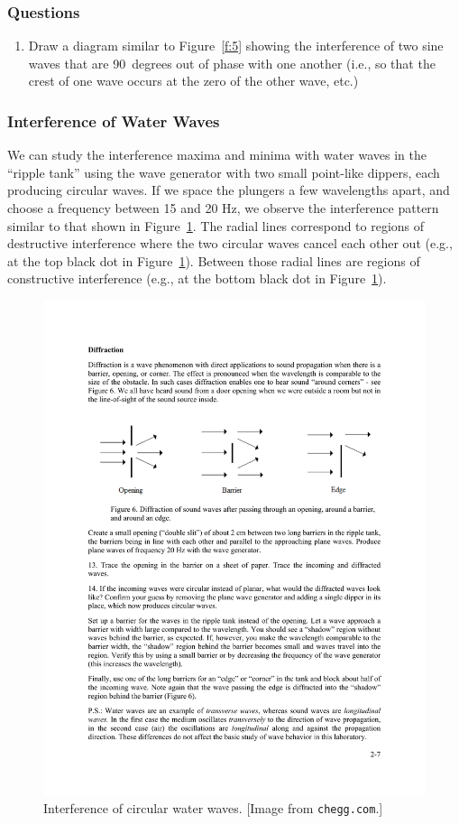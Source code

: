 \documentclass[11pt]{NSF}
\def\ben{\begin{enumerate}}
\def\een{\end{enumerate}}
\def\i{\item{}}
\begin{document}
\subsubsection*{Questions}
\ben

\i Draw a diagram similar to Figure~\ref{f:5} 
showing the interference of two sine waves that are 90~degrees
out of phase with one another 
(i.e., so that the crest of one wave occurs at the zero of the other wave, etc.)

\een

\subsubsection{Interference of Water Waves}

We can study the interference maxima and minima with water waves in the 
``ripple tank” using the wave generator with two small point-like dippers, 
each producing circular waves. 
If we space the plungers a few wavelengths apart, and choose a 
frequency between 15 and 20 Hz, we observe the interference pattern
similar to that shown in Figure~\ref{f:6}.
The radial lines correspond to regions of destructive interference
where the two circular waves cancel each other out (e.g., at the top 
black dot in Figure~\ref{f:6}).
Between those radial lines are regions of constructive interference
(e.g., at the bottom black dot in Figure~\ref{f:6}).
%
\begin{figure}[hbtp]
\begin{center}
\includegraphics[width=.5\textwidth]{fig2_6}
\caption{Interference of circular water waves.
[Image from {\tt chegg.com}.]}
\label{f:6}
\end{center}
\end{figure}
%
\end{document}
